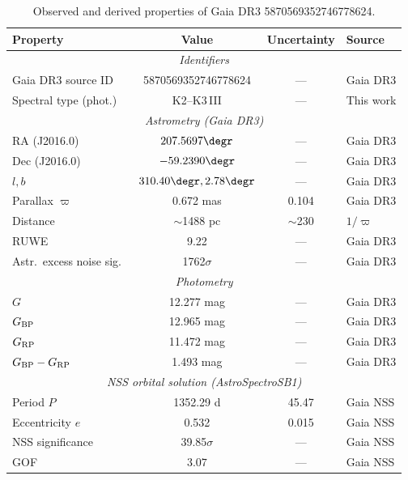 \documentclass[usenatbib,fleqn]{mnras}
\begin{document}
\begin{table}
\centering
\caption{Observed and derived properties of
Gaia DR3 5870569352746778624.}
\label{tab:observed}
\begin{tabular}{lccl}
\toprule
Property & Value & Uncertainty & Source \\
\midrule
\multicolumn{4}{c}{\textit{Identifiers}} \\
Gaia DR3 source ID     & 5870569352746778624  & ---      & Gaia DR3 \\
Spectral type (phot.)  & K2--K3\,III          & ---      & This work \\
\midrule
\multicolumn{4}{c}{\textit{Astrometry (Gaia DR3)}} \\
RA (J2016.0)           & $207.5697\degr$      & ---      & Gaia DR3 \\
Dec (J2016.0)          & $-59.2390\degr$      & ---      & Gaia DR3 \\
$l, b$                 & $310.40\degr, 2.78\degr$ & ---  & Gaia DR3 \\
Parallax $\varpi$      & 0.672 mas            & 0.104    & Gaia DR3 \\
Distance               & $\sim$1488 pc        & $\sim$230 & $1/\varpi$ \\
RUWE                   & 9.22                 & ---      & Gaia DR3 \\
Astr.\ excess noise sig.\ & 1762$\sigma$      & ---      & Gaia DR3 \\
\midrule
\multicolumn{4}{c}{\textit{Photometry}} \\
$G$                    & 12.277 mag           & ---      & Gaia DR3 \\
$G_{\rm BP}$           & 12.965 mag           & ---      & Gaia DR3 \\
$G_{\rm RP}$           & 11.472 mag           & ---      & Gaia DR3 \\
$G_{\rm BP} - G_{\rm RP}$ & 1.493 mag         & ---      & Gaia DR3 \\
\midrule
\multicolumn{4}{c}{\textit{NSS orbital solution (AstroSpectroSB1)}} \\
Period $P$             & 1352.29 d            & 45.47    & Gaia NSS \\
Eccentricity $e$       & 0.532                & 0.015    & Gaia NSS \\
NSS significance       & 39.85$\sigma$        & ---      & Gaia NSS \\
GOF                    & $3.07$               & ---      & Gaia NSS \\

\end{tabular}
\end{table}
\end{document}
